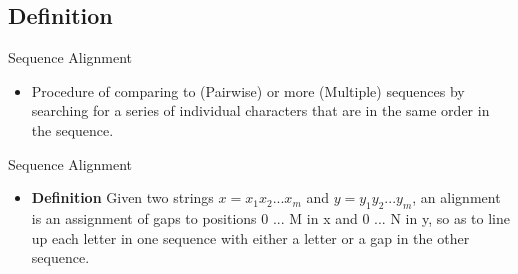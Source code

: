 \documentclass{bredelebeamer}
\begin{document}
\subsection{Definition}
\begin{frame}{Sequence Alignment}
\begin{itemize}
    \item  Procedure of comparing to (Pairwise) or more (Multiple) sequences by searching for a series of individual characters that are in the same order in the sequence.
    \linebreak
    \linebreak
    \linebreak
\newline
\newline
\end{itemize}
\end{frame}
\begin{frame}{Sequence Alignment}
    \begin{itemize}
        \item \textbf{\large{Definition}}
        \linebreak
        \linebreak
        Given two strings $x = x_1 x_2 ... x_m$ and $y = y_1 y_2 ... y_m$, \linebreak
        an alignment is an assignment of gaps to positions 0 ... M in x and 0 ... N in y, so as to line up each letter in one sequence with either a letter or a gap in the other sequence.
    \end{itemize}
\end{frame}
\end{document}
